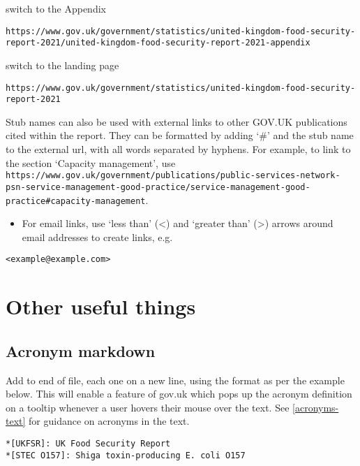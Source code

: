 \documentclass[
]{book}
\providecommand{\tightlist}{%
  \setlength{\itemsep}{0pt}\setlength{\parskip}{0pt}}
\begin{document}
switch to the Appendix

\begin{verbatim}
https://www.gov.uk/government/statistics/united-kingdom-food-security-report-2021/united-kingdom-food-security-report-2021-appendix
\end{verbatim}

switch to the landing page

\begin{verbatim}
https://www.gov.uk/government/statistics/united-kingdom-food-security-report-2021
\end{verbatim}

Stub names can also be used with external links to other GOV.UK publications cited within the report. They can be formatted by adding `\#' and the stub name to the external url, with all words separated by hyphens. For example, to link to the section `Capacity management', use \texttt{https://www.gov.uk/government/publications/public-services-network-psn-service-management-good-practice/service-management-good-practice\#capacity-management}.

\begin{itemize}
\tightlist
\item
  For email links, use `less than' (\textless) and `greater than' (\textgreater) arrows around email addresses to create links, e.g.
\end{itemize}

\begin{verbatim}
<example@example.com>
\end{verbatim}

\hypertarget{other-useful-things}{%
\section{Other useful things}\label{other-useful-things}}

\hypertarget{acronyms-web}{%
\subsection{Acronym markdown}\label{acronyms-web}}

Add to end of file, each one on a new line, using the format as per the example
below. This will enable a feature of gov.uk which pops up the acronym definition
on a tooltip whenever a user hovers their mouse over the text. See
\ref{acronyms-text} for guidance on acronyms in the text.

\begin{verbatim}
*[UKFSR]: UK Food Security Report
*[STEC O157]: Shiga toxin-producing E. coli O157
\end{verbatim}
\end{document}
